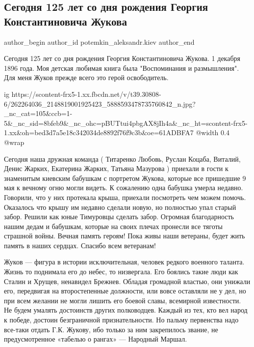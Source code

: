  
 
 
 
 
 
\subsection{Сегодня 125 лет со дня рождения Георгия Константиновича Жукова}
\label{sec:01_12_2021.fb.potemkin_aleksandr.kiev.1.125_let_georgij_zhukov}
 
\ifcmt
 author_begin
   author_id potemkin_aleksandr.kiev
 author_end
\fi

Сегодня 125 лет со дня рождения Георгия Константиновича Жукова. 1 декабря 1896
года. Моя детская любимая книга была "Воспоминания и размышления". Для меня
Жуков прежде всего это герой освободитель. 

\ifcmt
  ig https://scontent-frx5-1.xx.fbcdn.net/v/t39.30808-6/262264036_2148819001925423_5888593478735760842_n.jpg?_nc_cat=105&ccb=1-5&_nc_sid=8bfeb9&_nc_ohc=pBUTtui4pbgAX8jIh4a&_nc_ht=scontent-frx5-1.xx&oh=bed3d7a5e18c342034de8892f76f9c3b&oe=61ADBFA7
  @width 0.4
  @wrap 
\fi

Сегодня наша дружная команда ( Титаренко Любовь, Руслан Коцаба, Виталий, Денис
Жарких, Екатерина Жарких, Татьяна Мазурова ) приехали в гости к знаменитым
киевским бабушкам с портретом Жукова, которые все пришедшие 9 мая к вечному
огню могли видеть. К сожалению одна бабушка умерла недавно. Говорили, что у них
протекала крыша, приехали посмотреть чем можем помочь. Оказалось что крышу им
недавно сделали новую, но полностью упал старый забор. Решили как юные
Тимуровцы сделать забор. Огромная благодарность нашим дедам и бабушкам, которые
на своих плечах пронесли все тяготы страшной войны. Вечная память героям! Пока
живы наши ветераны, будет жить память в наших сердцах. Спасибо всем ветеранам! 

Жуков — фигура в истории исключительная, человек редкого военного таланта.
Жизнь то поднимала его до небес, то низвергала. Его боялись такие люди как
Сталин и Хрущев, ненавидел Брежнев. Обладая громадной властью, они унижали его,
передвигая на второстепенные должности, или вовсе оставляли не у дел, но при
всем желании не могли лишить его боевой славы, всемирной известности. Не будем
умалять достоинств других полководцев. Каждый из тех, кто вел народ к победе,
достоин безграничной признательности. Но пальму первенства надо все-таки отдать
Г.К. Жукову, ибо только за ним закрепилось звание, не предусмотренное «табелью
о рангах» — Народный Маршал.
